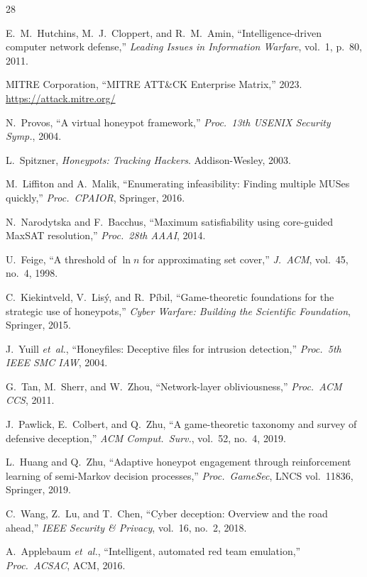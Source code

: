 \documentclass[journal]{IEEEtran}
\newcommand{\etal}{\emph{et~al.}}
\begin{document}
\begin{thebibliography}{28}

E.~M.~Hutchins, M.~J.~Cloppert, and R.~M.~Amin,
``Intelligence-driven computer network defense,''
\textit{Leading Issues in Information Warfare}, vol.~1,
p.~80, 2011.

MITRE Corporation, ``MITRE ATT\&CK Enterprise Matrix,''
2023. \url{https://attack.mitre.org/}

N.~Provos, ``A virtual honeypot framework,''
\textit{Proc.\ 13th USENIX Security Symp.}, 2004.

L.~Spitzner, \textit{Honeypots: Tracking Hackers}.
Addison-Wesley, 2003.

M.~Liffiton and A.~Malik,
``Enumerating infeasibility: Finding multiple MUSes quickly,''
\textit{Proc.\ CPAIOR}, Springer, 2016.

N.~Narodytska and F.~Bacchus,
``Maximum satisfiability using core-guided MaxSAT
resolution,'' \textit{Proc.\ 28th AAAI}, 2014.

U.~Feige, ``A threshold of $\ln n$ for approximating set
cover,'' \textit{J.\ ACM}, vol.~45, no.~4, 1998.

C.~Kiekintveld, V.~Lis\'{y}, and R.~P\'{i}bil,
``Game-theoretic foundations for the strategic use of
honeypots,'' \textit{Cyber Warfare: Building the Scientific
Foundation}, Springer, 2015.

J.~Yuill \etal{}, ``Honeyfiles: Deceptive files for
intrusion detection,'' \textit{Proc.\ 5th IEEE SMC IAW},
2004.

G.~Tan, M.~Sherr, and W.~Zhou,
``Network-layer obliviousness,'' \textit{Proc.\ ACM CCS},
2011.

J.~Pawlick, E.~Colbert, and Q.~Zhu,
``A game-theoretic taxonomy and survey of defensive
deception,'' \textit{ACM Comput.\ Surv.}, vol.~52,
no.~4, 2019.

L.~Huang and Q.~Zhu,
``Adaptive honeypot engagement through reinforcement
learning of semi-Markov decision processes,''
\textit{Proc.\ GameSec}, LNCS vol.~11836, Springer, 2019.

C.~Wang, Z.~Lu, and T.~Chen,
``Cyber deception: Overview and the road ahead,''
\textit{IEEE Security \& Privacy}, vol.~16, no.~2, 2018.

A.~Applebaum \etal{},
``Intelligent, automated red team emulation,''
\textit{Proc.\ ACSAC}, ACM, 2016.


\end{thebibliography}
\end{document}
